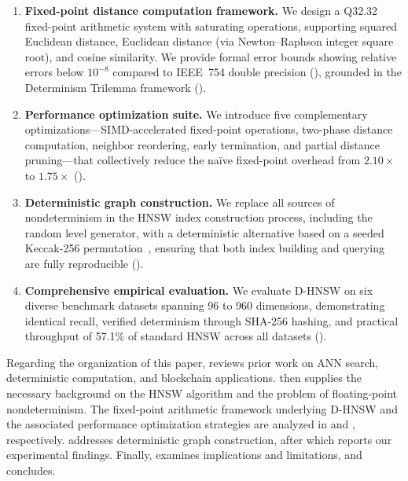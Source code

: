 \documentclass[10pt,journal,compsoc]{IEEEtran}
\newcommand{\dhnsw}{\textsc{D-HNSW}}
\newcommand{\hnsw}{\textsc{HNSW}}
\begin{document}
\begin{enumerate}[leftmargin=*]
  \item \textbf{Fixed-point distance computation framework.} We design a Q32.32 fixed-point arithmetic system with saturating operations, supporting squared Euclidean distance, Euclidean distance (via Newton--Raphson integer square root), and cosine similarity. We provide formal error bounds showing relative errors below $10^{-8}$ compared to IEEE~754 double precision (), grounded in the Determinism Trilemma framework ().

  \item \textbf{Performance optimization suite.} We introduce five complementary optimizations---SIMD-accelerated fixed-point operations, two-phase distance computation, neighbor reordering, early termination, and partial distance pruning---that collectively reduce the na\"ive fixed-point overhead from $2.10\times$ to $1.75\times$ ().

  \item \textbf{Deterministic graph construction.} We replace all sources of nondeterminism in the \hnsw{} index construction process, including the random level generator, with a deterministic alternative based on a seeded Keccak-256 permutation~\cite{bertoni2013keccak}, ensuring that both index building and querying are fully reproducible ().

  \item \textbf{Comprehensive empirical evaluation.} We evaluate \dhnsw{} on six diverse benchmark datasets spanning 96 to 960 dimensions, demonstrating identical recall, verified determinism through SHA-256 hashing, and practical throughput of 57.1\% of standard \hnsw{} across all datasets ().
\end{enumerate}

Regarding the organization of this paper,  reviews prior work on ANN search, deterministic computation, and blockchain applications.  then supplies the necessary background on the \hnsw{} algorithm and the problem of floating-point nondeterminism. The fixed-point arithmetic framework underlying \dhnsw{} and the associated performance optimization strategies are analyzed in  and , respectively.  addresses deterministic graph construction, after which  reports our experimental findings. Finally,  examines implications and limitations, and  concludes.
\end{document}
